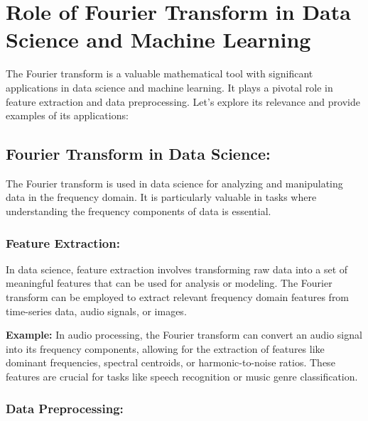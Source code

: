 \documentclass[11pt]{article}
\begin{document}
    \hypertarget{role-of-fourier-transform-in-data-science-and-machine-learning}{%
\section{Role of Fourier Transform in Data Science and Machine
Learning}\label{role-of-fourier-transform-in-data-science-and-machine-learning}}

The Fourier transform is a valuable mathematical tool with significant
applications in data science and machine learning. It plays a pivotal
role in feature extraction and data preprocessing. Let's explore its
relevance and provide examples of its applications:

\hypertarget{fourier-transform-in-data-science}{%
\subsection{Fourier Transform in Data
Science:}\label{fourier-transform-in-data-science}}

The Fourier transform is used in data science for analyzing and
manipulating data in the frequency domain. It is particularly valuable
in tasks where understanding the frequency components of data is
essential.

\hypertarget{feature-extraction}{%
\subsubsection{\texorpdfstring{\textbf{Feature
Extraction:}}{Feature Extraction:}}\label{feature-extraction}}

In data science, feature extraction involves transforming raw data into
a set of meaningful features that can be used for analysis or modeling.
The Fourier transform can be employed to extract relevant frequency
domain features from time-series data, audio signals, or images.

\textbf{Example:} In audio processing, the Fourier transform can convert
an audio signal into its frequency components, allowing for the
extraction of features like dominant frequencies, spectral centroids, or
harmonic-to-noise ratios. These features are crucial for tasks like
speech recognition or music genre classification.

\hypertarget{data-preprocessing}{%
\subsubsection{\texorpdfstring{\textbf{Data
Preprocessing:}}{Data Preprocessing:}}\label{data-preprocessing}}
\end{document}
